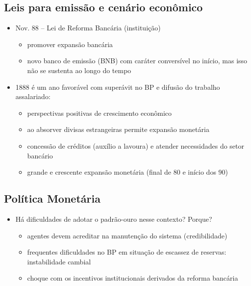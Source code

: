 \documentclass[a4paper,12pt]{article}[abntex2]
\begin{document}
\subsection{\textbf{Leis para emissão e cenário econômico}}
\begin{itemize}
    \item Nov. 88 – Lei de Reforma Bancária (instituição)
    \begin{itemize}
        \item promover expansão bancária
    \end{itemize}
    \begin{itemize}
        \item novo banco de emissão (BNB) com caráter conversível no início, mas isso não se sustenta ao longo do tempo
    \end{itemize}
    \item 1888 é um ano favorável com superávit no BP e difusão do trabalho assalariado:
    \begin{itemize}
        \item perspectivas positivas de crescimento econômico
    \end{itemize}
    \begin{itemize}
        \item ao absorver divisas estrangeiras permite expansão monetária
    \end{itemize}
    \begin{itemize}
        \item concessão de créditos (auxílio a lavoura) e atender necessidades do setor bancário
    \end{itemize}
    \begin{itemize}
        \item grande e crescente expansão monetária (final de 80 e início dos 90)
    \end{itemize}
\end{itemize}
\subsection{\textbf{Política Monetária}}
\begin{itemize}
    \item Há dificuldades de adotar o padrão-ouro
nesse contexto? Porque?
\begin{itemize}
    \item agentes devem acreditar na manutenção do sistema (credibilidade)
\end{itemize}
\begin{itemize}
    \item frequentes dificuldades no BP em situação de escassez de reservas: instabilidade cambial
\end{itemize}
\begin{itemize}
    \item choque com os incentivos institucionais derivados da reforma bancária
\end{itemize}

\end{itemize}
\end{document}
